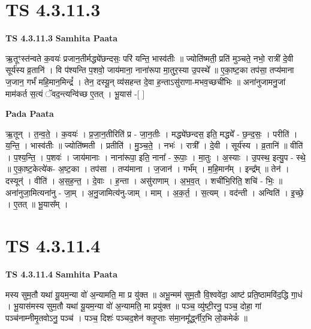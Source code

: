 \documentclass[17pt]{extarticle}
\begin{document}

\section{ TS 4.3.11.3 }

\textbf{TS 4.3.11.3 } \newline
\textbf{Samhita Paata} \newline

ऋ॒तूꣳस्त॑न्वते क॒वयः॑ प्रजान॒तीर्मद्ध्ये॑छन्दसः॒ परि॑ यन्ति॒ भास्व॑तीः ॥ ज्योति॑ष्मती॒ प्रति॑ मुञ्चते॒ नभो॒ रात्री॑ दे॒वी सूर्य॑स्य व्र॒तानि॑ । वि प॑श्यन्ति प॒शवो॒ जाय॑माना॒ नाना॑रूपा मा॒तुर॒स्या उ॒पस्थे᳚ ॥ ए॒का॒ष्ट॒का तप॑सा॒ तप्य॑माना ज॒जान॒ गर्भं॑ महि॒मान॒मिन्द्रं᳚ । तेन॒ दस्यू॒न् व्य॑सहन्त दे॒वा ह॒न्ताऽसु॑राणा-मभव॒च्छची॑भिः ॥ अना॑नुजामनु॒जां माम॑कर्त स॒त्यं ॅवद॒न्त्यन्वि॑च्छ ए॒तत् । भू॒यास॑ -[  ] \newline

\textbf{Pada Paata} \newline

ऋ॒तून् । त॒न्व॒ते॒ । क॒वयः॑ । प्र॒जा॒न॒तीरिति॑ प्र - जा॒न॒तीः । मद्ध्ये॑छन्दस॒ इति॒ मद्ध्ये᳚ - छ॒न्द॒सः॒ । परीति॑ । य॒न्ति॒ । भास्व॑तीः ॥ ज्योति॑ष्मती । प्रतीति॑ । मु॒ञ्च॒ते॒ । नभः॑ । रात्री᳚ । दे॒वी । सूर्य॑स्य । व्र॒तानि॑ ॥ वीति॑ । प॒श्य॒न्ति॒ । प॒शवः॑ । जाय॑मानाः । नाना॑रूपा॒ इति॒ नाना᳚ - रू॒पाः॒ । मा॒तुः । अ॒स्याः । उ॒पस्थ॒ इत्यु॒प - स्थे॒ ॥ ए॒का॒ष्ट॒केत्ये॑क- अ॒ष्ट॒का । तप॑सा । तप्य॑माना । ज॒जान॑ । गर्भ᳚म् । म॒हि॒मान᳚म् । इन्द्र᳚म् ॥ तेन॑ । दस्यून्॑ । वीति॑ । अ॒स॒ह॒न्त॒ । दे॒वाः । ह॒न्ता । असु॑राणाम् । अ॒भ॒व॒त् । शची॑भि॒रिति॒ शचि॑ - भिः॒ ॥ अना॑नुजा॒मित्यना॑नु - जा॒म् । अ॒नु॒जामित्य॑नु-जाम् । माम् । अ॒क॒र्त॒ । स॒त्यम् । वद॑न्ती । अन्विति॑ । इ॒च्छे॒ । ए॒तत् ॥ भू॒यास᳚म् ।  \newline





\section{ TS 4.3.11.4 }

\textbf{TS 4.3.11.4 } \newline
\textbf{Samhita Paata} \newline

मस्य सुम॒तौ यथा॑ यू॒यम॒न्या वो॑ अ॒न्यामति॒ मा प्र यु॑क्त ॥ अभू॒न्मम॑ सुम॒तौ वि॒श्ववे॑दा॒ आष्ट॑ प्रति॒ष्ठामवि॑द॒द्धि गा॒धं । भू॒यास॑मस्य सुम॒तौ यथा॑ यू॒यम॒न्या वो॑ अ॒न्यामति॒ मा प्रयु॑क्त ॥ पञ्च॒ व्यु॑ष्टी॒रनु॒ पञ्च॒ दोहा॒ गां पञ्च॑नाम्नीमृ॒तवोऽनु॒ पञ्च॑ । पञ्च॒ दिशः॑ पञ्चद॒शेन॑ क्लृ॒प्ताः स॑मा॒नमू᳚र्द्ध्नीर॒भि लो॒कमेकं᳚ ॥ \newline
\end{document}
